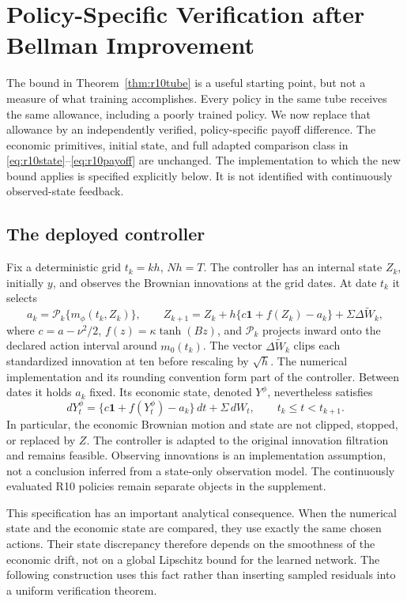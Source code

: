 \section{Policy-Specific Verification after Bellman Improvement}\label{sec:r11specific}
The bound in Theorem~\ref{thm:r10tube} is a useful starting point, but not a measure of what training accomplishes. Every policy in the same tube receives the same allowance, including a poorly trained policy. We now replace that allowance by an independently verified, policy-specific payoff difference. The economic primitives, initial state, and full adapted comparison class in \eqref{eq:r10state}--\eqref{eq:r10payoff} are unchanged. The implementation to which the new bound applies is specified explicitly below. It is not identified with continuously observed-state feedback.

\subsection{The deployed controller}
Fix a deterministic grid $t_k=kh$, $Nh=T$. The controller has an internal state $Z_k$, initially $y$, and observes the Brownian innovations at the grid dates. At date $t_k$ it selects
\begin{equation}\label{eq:r11implementation}
 a_k=\mathcal P_k\{m_\phi(t_k,Z_k)\},\qquad
 Z_{k+1}=Z_k+h\{c\bm1+f(Z_k)-a_k\}+\Sigma\Delta\widetilde W_k,
\end{equation}
where $c=a-\nu^2/2$, $f(z)=\kappa\tanh(Bz)$, and $\mathcal P_k$ projects inward onto the declared action interval around $m_0(t_k)$. The vector $\Delta\widetilde W_k$ clips each standardized innovation at ten before rescaling by $\sqrt h$. The numerical implementation and its rounding convention form part of the controller. Between dates it holds $a_k$ fixed. Its economic state, denoted $Y^\phi$, nevertheless satisfies
\[
 dY^\phi_t=\{c\bm1+f(Y^\phi_t)-a_k\}\,dt+\Sigma\,dW_t,
 \qquad t_k\leq t<t_{k+1}.
\]
In particular, the economic Brownian motion and state are not clipped, stopped, or replaced by $Z$. The controller is adapted to the original innovation filtration and remains feasible. Observing innovations is an implementation assumption, not a conclusion inferred from a state-only observation model. The continuously evaluated R10 policies remain separate objects in the supplement.

This specification has an important analytical consequence. When the numerical state and the economic state are compared, they use exactly the same chosen actions. Their state discrepancy therefore depends on the smoothness of the economic drift, not on a global Lipschitz bound for the learned network. The following construction uses this fact rather than inserting sampled residuals into a uniform verification theorem.

